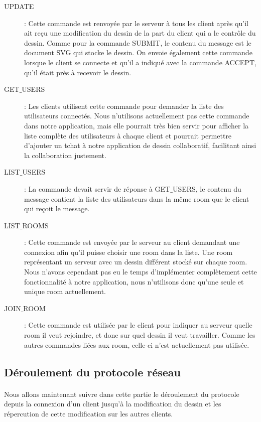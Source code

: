 \documentclass[a4paper,11pt]{article}
\begin{document}
\begin{description}
\item [UPDATE] : Cette commande est renvoyée par le serveur à tous les client après qu'il ait reçu une modification du dessin de la part du client qui a le contrôle du dessin. Comme pour la commande SUBMIT, le contenu du message est le document SVG qui stocke le dessin.
On envoie également cette commande lorsque le client se connecte et qu'il a indiqué avec la commande ACCEPT, qu'il était près à recevoir le dessin.

\item [GET$\_$USERS] : Les clients utilisent cette commande pour demander la liste des utilisateurs connectés. Nous n'utilisons actuellement pas cette commande dans notre application, mais elle pourrait très bien servir pour afficher la liste complète des utilisateurs à chaque client et pourrait permettre d'ajouter un tchat à notre application de dessin collaboratif, facilitant ainsi la collaboration justement.

\item [LIST$\_$USERS] : La commande devait servir de réponse à GET$\_$USERS, le contenu du message contient la liste des utilisateurs dans la même room que le client qui reçoit le message.

\item [LIST$\_$ROOMS] : Cette commande est envoyée par le serveur au client demandant une connexion afin qu'il puisse choisir une room dans la liste. Une room représentant un serveur avec un dessin différent stocké sur chaque room.
Nous n'avons cependant pas eu le temps d'implémenter complètement cette fonctionnalité à notre application, nous n'utilisons donc qu'une seule et unique room actuellement.

\item [JOIN$\_$ROOM] : Cette commande est utilisée par le client pour indiquer au serveur quelle room il veut rejoindre, et donc sur quel dessin il veut travailler. Comme les autres commandes liées aux room, celle-ci n'est actuellement pas utilisée.
\end{description}

\subsection{Déroulement du protocole réseau}
\paragraph{}Nous allons maintenant suivre dans cette partie le déroulement du protocole depuis la connexion d'un client jusqu'à la modification du dessin et les répercution de cette modification sur les autres clients.
\end{document}
